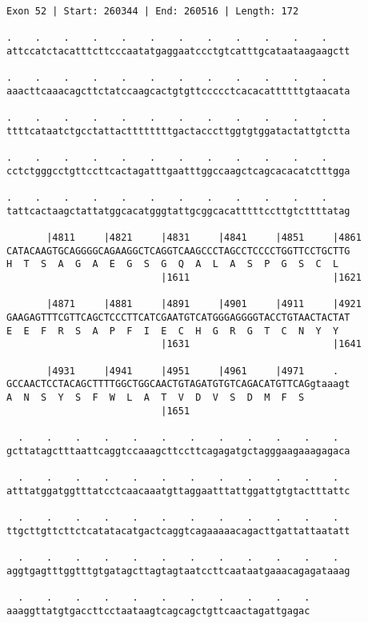 \documentclass{article}
\begin{document}
\begin{Verbatim}
Exon 52 | Start: 260344 | End: 260516 | Length: 172
 
.    .    .    .    .    .    .    .    .    .    .    .    
attccatctacatttcttcccaatatgaggaatccctgtcatttgcataataagaagctt
  
.    .    .    .    .    .    .    .    .    .    .    .    
aaacttcaaacagcttctatccaagcactgtgttccccctcacacattttttgtaacata
  
.    .    .    .    .    .    .    .    .    .    .    .    
ttttcataatctgcctattacttttttttgactacccttggtgtggatactattgtctta
  
.    .    .    .    .    .    .    .    .    .    .    .    
cctctgggcctgttccttcactagatttgaatttggccaagctcagcacacatctttgga
  
.    .    .    .    .    .    .    .    .    .    .    .    
tattcactaagctattatggcacatgggtattgcggcacatttttccttgtcttttatag
  
       |4811     |4821     |4831     |4841     |4851     |4861
CATACAAGTGCAGGGGCAGAAGGCTCAGGTCAAGCCCTAGCCTCCCCTGGTTCCTGCTTG
H  T  S  A  G  A  E  G  S  G  Q  A  L  A  S  P  G  S  C  L  
                           |1611                         |1621
  
       |4871     |4881     |4891     |4901     |4911     |4921
GAAGAGTTTCGTTCAGCTCCCTTCATCGAATGTCATGGGAGGGGTACCTGTAACTACTAT
E  E  F  R  S  A  P  F  I  E  C  H  G  R  G  T  C  N  Y  Y  
                           |1631                         |1641
  
       |4931     |4941     |4951     |4961     |4971     .  
GCCAACTCCTACAGCTTTTGGCTGGCAACTGTAGATGTGTCAGACATGTTCAGgtaaagt
A  N  S  Y  S  F  W  L  A  T  V  D  V  S  D  M  F  S        
                           |1651                            
  
  .    .    .    .    .    .    .    .    .    .    .    .  
gcttatagctttaattcaggtccaaagcttccttcagagatgctagggaagaaagagaca
  
  .    .    .    .    .    .    .    .    .    .    .    .  
atttatggatggtttatcctcaacaaatgttaggaatttattggattgtgtactttattc
  
  .    .    .    .    .    .    .    .    .    .    .    .  
ttgcttgttcttctcatatacatgactcaggtcagaaaaacagacttgattattaatatt
  
  .    .    .    .    .    .    .    .    .    .    .    .  
aggtgagtttggtttgtgatagcttagtagtaatccttcaataatgaaacagagataaag
  
  .    .    .    .    .    .    .    .    .    .    .
aaaggttatgtgaccttcctaataagtcagcagctgttcaactagattgagac
\end{Verbatim}
\end{document}
